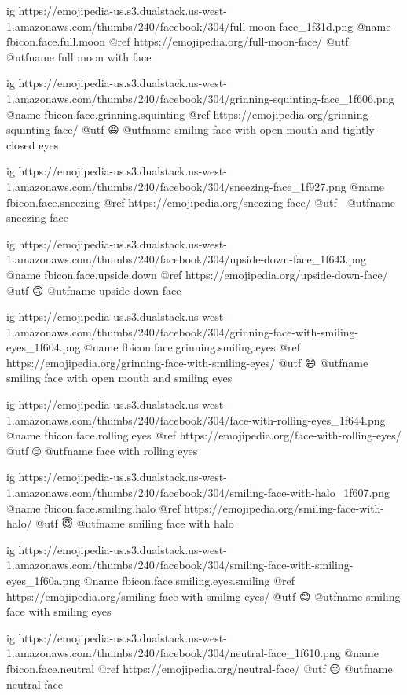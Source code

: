   ig https://emojipedia-us.s3.dualstack.us-west-1.amazonaws.com/thumbs/240/facebook/304/full-moon-face_1f31d.png
  @name fbicon.face.full.moon
  @ref https://emojipedia.org/full-moon-face/
  @utf 🌝
  @utfname full moon with face

  ig https://emojipedia-us.s3.dualstack.us-west-1.amazonaws.com/thumbs/240/facebook/304/grinning-squinting-face_1f606.png
  @name fbicon.face.grinning.squinting  
  @ref https://emojipedia.org/grinning-squinting-face/
  @utf 😆
  @utfname smiling face with open mouth and tightly-closed eyes

  ig https://emojipedia-us.s3.dualstack.us-west-1.amazonaws.com/thumbs/240/facebook/304/sneezing-face_1f927.png
  @name fbicon.face.sneezing
  @ref https://emojipedia.org/sneezing-face/
  @utf 🤧
  @utfname sneezing face

  ig https://emojipedia-us.s3.dualstack.us-west-1.amazonaws.com/thumbs/240/facebook/304/upside-down-face_1f643.png
  @name fbicon.face.upside.down
  @ref https://emojipedia.org/upside-down-face/
  @utf 🙃
  @utfname upside-down face

  ig https://emojipedia-us.s3.dualstack.us-west-1.amazonaws.com/thumbs/240/facebook/304/grinning-face-with-smiling-eyes_1f604.png
  @name fbicon.face.grinning.smiling.eyes
  @ref https://emojipedia.org/grinning-face-with-smiling-eyes/
  @utf 😄
  @utfname smiling face with open mouth and smiling eyes

  ig https://emojipedia-us.s3.dualstack.us-west-1.amazonaws.com/thumbs/240/facebook/304/face-with-rolling-eyes_1f644.png
  @name fbicon.face.rolling.eyes
  @ref https://emojipedia.org/face-with-rolling-eyes/
  @utf 🙄
  @utfname face with rolling eyes

  ig https://emojipedia-us.s3.dualstack.us-west-1.amazonaws.com/thumbs/240/facebook/304/smiling-face-with-halo_1f607.png
  @name fbicon.face.smiling.halo
  @ref https://emojipedia.org/smiling-face-with-halo/
  @utf 😇
  @utfname smiling face with halo

  ig https://emojipedia-us.s3.dualstack.us-west-1.amazonaws.com/thumbs/240/facebook/304/smiling-face-with-smiling-eyes_1f60a.png
  @name fbicon.face.smiling.eyes.smiling
  @ref https://emojipedia.org/smiling-face-with-smiling-eyes/
  @utf 😊 
  @utfname smiling face with smiling eyes

  ig https://emojipedia-us.s3.dualstack.us-west-1.amazonaws.com/thumbs/240/facebook/304/neutral-face_1f610.png
  @name fbicon.face.neutral
  @ref https://emojipedia.org/neutral-face/
  @utf 😐
  @utfname neutral face

